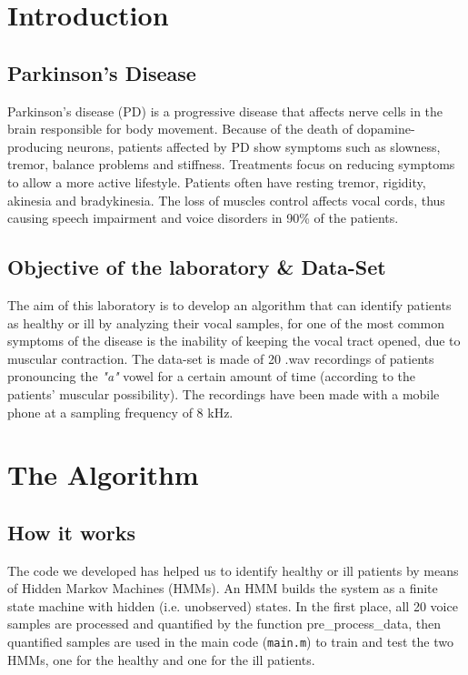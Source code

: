 \documentclass[12pt]{article}
\begin{document}
\section{Introduction}
\subsection{Parkinson's Disease}
Parkinson’s disease (PD) is a progressive disease that affects nerve cells in the brain responsible for body movement. Because of the death of dopamine-producing neurons, patients affected by PD show symptoms such as slowness, tremor, balance problems and stiffness. Treatments focus on reducing symptoms to allow a more active lifestyle. Patients often have resting tremor, rigidity, akinesia and bradykinesia. The loss of muscles control affects vocal cords, thus causing speech impairment and voice disorders in 90\% of the patients. 


\subsection{Objective of the laboratory \& Data-Set}
The aim of this laboratory is to develop an algorithm that can identify patients as healthy or ill by analyzing their vocal samples, for one of the most common symptoms of the disease is the inability of keeping the vocal tract opened, due to muscular contraction. 
The data-set is made of 20 .wav recordings of patients pronouncing the \textit{"a"} vowel for a certain amount of time (according to the patients' muscular possibility). The recordings have been made with a mobile phone at a sampling frequency of 8 kHz.

\section{The Algorithm}

\subsection{How it works}
The code we developed has helped us to identify healthy  or ill patients by means of Hidden Markov Machines (HMMs). An HMM builds the system as a finite state machine with hidden (i.e. unobserved) states. In the first place, all 20 voice samples are processed and quantified by the function pre\_process\_data, then quantified samples are used in the main code (\texttt{main.m}) to train and test the two HMMs, one for the healthy and one for the ill patients.
\end{document}
